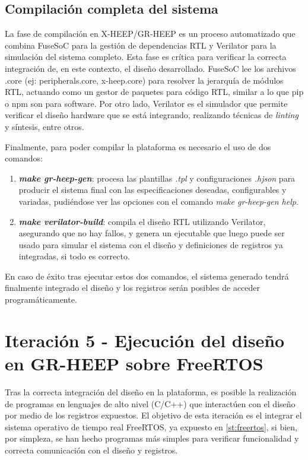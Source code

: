 \subsection{Compilación completa del sistema}
La fase de compilación en X-HEEP/GR-HEEP es un proceso automatizado que combina FuseSoC para la gestión de dependencias RTL y Verilator para la simulación del sistema completo. Esta fase es crítica para verificar la correcta integración de, en este contexto, el diseño desarrollado. FuseSoC lee los archivos .core (ej: peripherals.core, x-heep.core) para resolver la jerarquía de módulos RTL, actuando como un gestor de paquetes para código RTL, similar a lo que pip o npm son para software. Por otro lado, Verilator es el simulador que permite verificar el diseño hardware que se está integrando, realizando técnicas de \textit{linting} y síntesis, entre otros. 

Finalmente, para poder compilar la plataforma es necesario el uso de dos comandos:

\begin{enumerate}
    \item \emph{\textbf{make gr-heep-gen}}: procesa las plantillas \emph{.tpl} y configuraciones \emph{.hjson} para producir el sistema final con las especificaciones deseadas, configurables y variadas, pudiéndose ver las opciones con el comando \emph{make gr-heep-gen help}.
    \item \emph{\textbf{make verilator-build}}: compila el diseño RTL utilizando Verilator, asegurando que no hay fallos, y genera un ejecutable que luego puede ser usado para simular el sistema con el diseño y definiciones de registros ya integradas, si todo es correcto.
\end{enumerate}

En caso de éxito tras ejecutar estos dos comandos, el sistema generado tendrá finalmente integrado el diseño y los registros serán posibles de acceder programáticamente.

\section{Iteración 5 - Ejecución del diseño en GR-HEEP sobre FreeRTOS}
Tras la correcta integración del diseño en la plataforma, es posible la realización de programas en lenguajes de alto nivel (C/C++) que interactúen con el diseño por medio de los registros expuestos. El objetivo de esta iteración es el integrar el sistema operativo de tiempo real FreeRTOS, ya expuesto en \ref{st:freertos}, si bien, por simpleza, se han hecho programas más simples para verificar funcionalidad y correcta comunicación con el diseño y registros. 

